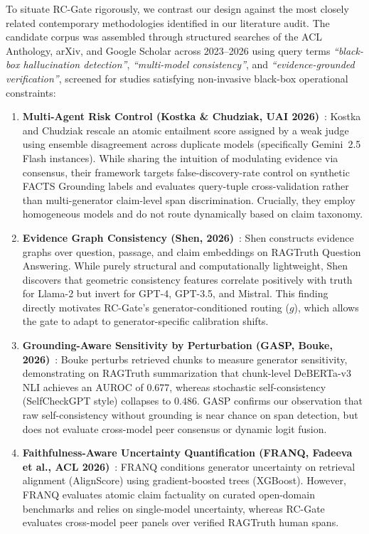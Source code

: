 \documentclass[pdflatex,sn-mathphys,Numbered]{sn-jnl}
\begin{document}
To situate RC-Gate rigorously, we contrast our design against the most closely related contemporary methodologies identified in our literature audit. The candidate corpus was assembled through structured searches of the ACL Anthology, arXiv, and Google Scholar across 2023--2026 using query terms \emph{``black-box hallucination detection''}, \emph{``multi-model consistency''}, and \emph{``evidence-grounded verification''}, screened for studies satisfying non-invasive black-box operational constraints:
\begin{enumerate}
    \item \textbf{Multi-Agent Risk Control (Kostka \& Chudziak, UAI 2026)}~\cite{kostka2026uncertainty}: Kostka and Chudziak rescale an atomic entailment score assigned by a weak judge using ensemble disagreement across duplicate models (specifically Gemini~2.5 Flash instances). While sharing the intuition of modulating evidence via consensus, their framework targets false-discovery-rate control on synthetic FACTS Grounding labels and evaluates query-tuple cross-validation rather than multi-generator claim-level span discrimination. Crucially, they employ homogeneous models and do not route dynamically based on claim taxonomy.
    \item \textbf{Evidence Graph Consistency (Shen, 2026)}~\cite{shen2026egc}: Shen constructs evidence graphs over question, passage, and claim embeddings on RAGTruth Question Answering. While purely structural and computationally lightweight, Shen discovers that geometric consistency features correlate positively with truth for Llama-2 but invert for GPT-4, GPT-3.5, and Mistral. This finding directly motivates RC-Gate's generator-conditioned routing ($g$), which allows the gate to adapt to generator-specific calibration shifts.
    \item \textbf{Grounding-Aware Sensitivity by Perturbation (GASP, Bouke, 2026)}~\cite{bouke2026gasp}: Bouke perturbs retrieved chunks to measure generator sensitivity, demonstrating on RAGTruth summarization that chunk-level DeBERTa-v3 NLI achieves an AUROC of 0.677, whereas stochastic self-consistency (SelfCheckGPT style) collapses to 0.486. GASP confirms our observation that raw self-consistency without grounding is near chance on span detection, but does not evaluate cross-model peer consensus or dynamic logit fusion.
    \item \textbf{Faithfulness-Aware Uncertainty Quantification (FRANQ, Fadeeva et al., ACL 2026)}~\cite{fadeeva2026franq}: FRANQ conditions generator uncertainty on retrieval alignment (AlignScore) using gradient-boosted trees (XGBoost). However, FRANQ evaluates atomic claim factuality on curated open-domain benchmarks and relies on single-model uncertainty, whereas RC-Gate evaluates cross-model peer panels over verified RAGTruth human spans.

\end{enumerate}
\end{document}
